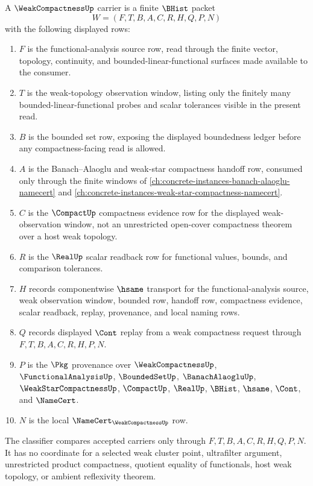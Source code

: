 \begin{definition}
\label{def:weak-compactness-carrier}
A $\WeakCompactnessUp$ carrier is a finite $\BHist$ packet
$$
W=(F,T,B,A,C,R,H,Q,P,N)
$$
with the following displayed rows:
\begin{enumerate}
\item $F$ is the functional-analysis source row, read through the finite vector, topology, continuity, and bounded-linear-functional surfaces made available to the consumer.
\item $T$ is the weak-topology observation window, listing only the finitely many bounded-linear-functional probes and scalar tolerances visible in the present read.
\item $B$ is the bounded set row, exposing the displayed boundedness ledger before any compactness-facing read is allowed.
\item $A$ is the Banach--Alaoglu and weak-star compactness handoff row, consumed only through the finite windows of \autoref{ch:concrete-instances-banach-alaoglu-namecert} and \autoref{ch:concrete-instances-weak-star-compactness-namecert}.
\item $C$ is the $\CompactUp$ compactness evidence row for the displayed weak-observation window, not an unrestricted open-cover compactness theorem over a host weak topology.
\item $R$ is the $\RealUp$ scalar readback row for functional values, bounds, and comparison tolerances.
\item $H$ records componentwise $\hsame$ transport for the functional-analysis source, weak observation window, bounded row, handoff row, compactness evidence, scalar readback, replay, provenance, and local naming rows.
\item $Q$ records displayed $\Cont$ replay from a weak compactness request through $F,T,B,A,C,R,H,P,N$.
\item $P$ is the $\Pkg$ provenance over $\WeakCompactnessUp$, $\FunctionalAnalysisUp$, $\BoundedSetUp$, $\BanachAlaogluUp$, $\WeakStarCompactnessUp$, $\CompactUp$, $\RealUp$, $\BHist$, $\hsame$, $\Cont$, and $\NameCert$.
\item $N$ is the local $\NameCert_{\WeakCompactnessUp}$ row.
\end{enumerate}
The classifier compares accepted carriers only through $F,T,B,A,C,R,H,Q,P,N$. It has no coordinate for a selected weak cluster point, ultrafilter argument, unrestricted product compactness, quotient equality of functionals, host weak topology, or ambient reflexivity theorem.
\end{definition}

